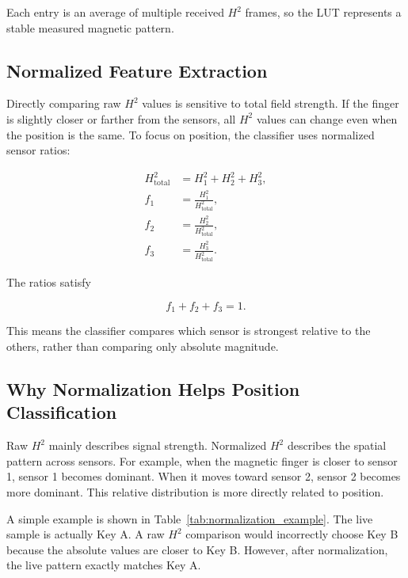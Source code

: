 Each entry is an average of multiple received $H^2$ frames, so the LUT represents a stable measured magnetic pattern.


\subsection{Normalized Feature Extraction}

Directly comparing raw $H^2$ values is sensitive to total field strength. If the finger is slightly closer or farther from the sensors, all $H^2$ values can change even when the position is the same. To focus on position, the classifier uses normalized sensor ratios:

\begin{align}
    H_{\mathrm{total}}^2 &= H_1^2 + H_2^2 + H_3^2, \\
    f_1 &= \frac{H_1^2}{H_{\mathrm{total}}^2}, \\
    f_2 &= \frac{H_2^2}{H_{\mathrm{total}}^2}, \\
    f_3 &= \frac{H_3^2}{H_{\mathrm{total}}^2}.
\end{align}

The ratios satisfy

\begin{equation}
    f_1 + f_2 + f_3 = 1.
\end{equation}

This means the classifier compares which sensor is strongest relative to the others, rather than comparing only absolute magnitude.

\subsection{Why Normalization Helps Position Classification}

Raw $H^2$ mainly describes signal strength. Normalized $H^2$ describes the spatial pattern across sensors. For example, when the magnetic finger is closer to sensor 1, sensor 1 becomes dominant. When it moves toward sensor 2, sensor 2 becomes more dominant. This relative distribution is more directly related to position.

A simple example is shown in Table~\ref{tab:normalization_example}. The live sample is actually Key A. A raw $H^2$ comparison would incorrectly choose Key B because the absolute values are closer to Key B. However, after normalization, the live pattern exactly matches Key A.

